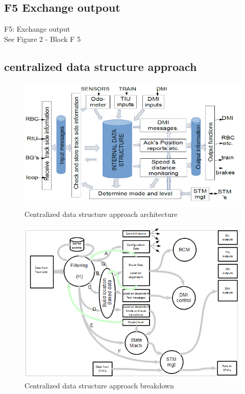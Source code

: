 \documentclass{template/openetcs_article}
\begin{document}
\newpage

 \subsection{F5 Exchange outpout}
 F5: Exchange output\\
 See Figure 2 - Block F 5\\
 
 \subsection{centralized data structure approach}
 \begin{figure}[hbtp]
\centering
\includegraphics [scale=0.6] {images/CentralizedDataStrukture_2}
\caption{Centralized data structure approach architecture}
\end{figure}


 \begin{figure}[hbtp]
\centering
\includegraphics [scale=0.7] {images/CentralizedDataStructure_1}
\caption{Centralized data structure approach breakdown}
\end{figure}
\end{document}
